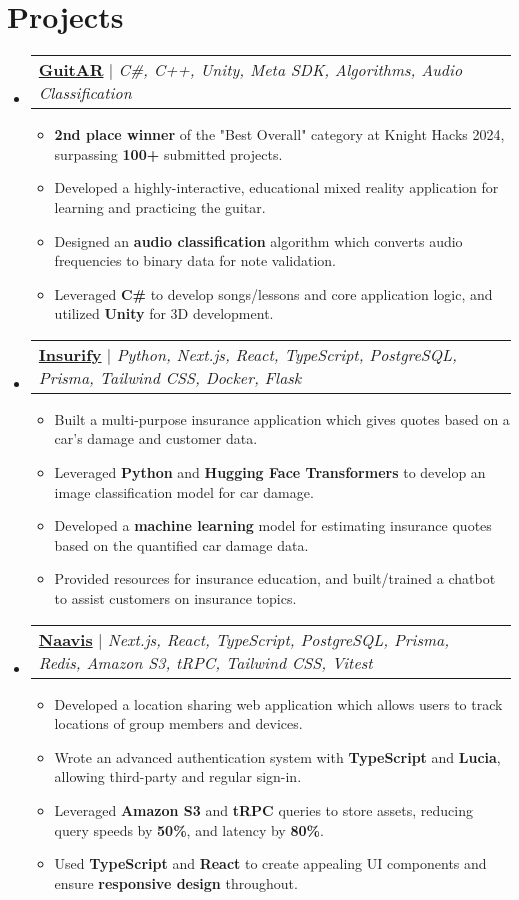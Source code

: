 \documentclass[letterpaper,11pt]{article}
\makeatletter
\newcommand{\resumeItem}[1]{
  \item\small{
    {#1 \vspace{-2pt}}
  }
}
\newcommand{\resumeProjectHeading}[2]{
    \item
    \begin{tabular*}{0.97\textwidth}{l@{\extracolsep{\fill}}r}
      \small#1\\
    \end{tabular*}\vspace{-7pt}
}
\newcommand{\resumeSubHeadingListStart}{\begin{itemize}[leftmargin=0.15in, label={}]}
\newcommand{\resumeSubHeadingListEnd}{\end{itemize}}
\newcommand{\resumeItemListStart}{\begin{itemize}}
\newcommand{\resumeItemListEnd}{\end{itemize}\vspace{-5pt}}
\makeatother
\begin{document}
\section{Projects}
    \resumeSubHeadingListStart
        \resumeProjectHeading
        {\textbf{\href{https://devpost.com/software/guitar-o3gw19}{GuitAR}} $|$ \emph{C\#, C++, Unity, Meta SDK, Algorithms, Audio Classification }}{June 2021 -- Present}
        \resumeItemListStart
          \resumeItem{\textbf{2nd place winner} of the "Best Overall" category at Knight Hacks 2024, surpassing \textbf{100+} submitted projects.}
          \resumeItem{Developed a highly-interactive, educational mixed reality application for learning and practicing the guitar.}
          \resumeItem{Designed an \textbf{audio classification} algorithm which converts audio frequencies to binary data for note validation.}
          \resumeItem{Leveraged \textbf{C\#} to develop songs/lessons and core application logic, and utilized \textbf{Unity} for 3D development.}
        \resumeItemListEnd
        \resumeProjectHeading
            {\textbf{\href{https://devpost.com/software/insurify-zj2dh4}{Insurify}} $|$ \emph{Python, Next.js, React, TypeScript, PostgreSQL, Prisma, Tailwind CSS, Docker, Flask}}{June 2021 -- Present}
          \resumeItemListStart
            \resumeItem{Built a multi-purpose insurance application which gives quotes based on a car's damage and customer data.}
            \resumeItem{Leveraged \textbf{Python} and \textbf{Hugging Face Transformers} to develop an image classification model for car damage.}
            \resumeItem{Developed a \textbf{machine learning} model for estimating insurance quotes based on the quantified car damage data.}
            \resumeItem{Provided resources for insurance education, and built/trained a chatbot to assist customers on insurance topics.}
          \resumeItemListEnd
      \resumeProjectHeading
          {\textbf{\href{https://github.com/naavis-app/app}{Naavis}} $|$ \emph{Next.js, React, TypeScript, PostgreSQL, Prisma, Redis, Amazon S3, tRPC, Tailwind CSS, Vitest}}{June 2021 -- Present}
          \resumeItemListStart
            \resumeItem{Developed a location sharing web application which allows users to track locations of group members and devices.}
            \resumeItem{Wrote an advanced authentication system with \textbf{TypeScript} and \textbf{Lucia}, allowing third-party and regular sign-in.}
            \resumeItem{Leveraged \textbf{Amazon S3} and \textbf{tRPC} queries to store assets, reducing query speeds by \textbf{50\%}, and latency by \textbf{80\%}.}
            \resumeItem{Used \textbf{TypeScript} and \textbf{React} to create appealing UI components and ensure \textbf{responsive design} throughout.}
          \resumeItemListEnd
    \resumeSubHeadingListEnd
%
\end{document}
